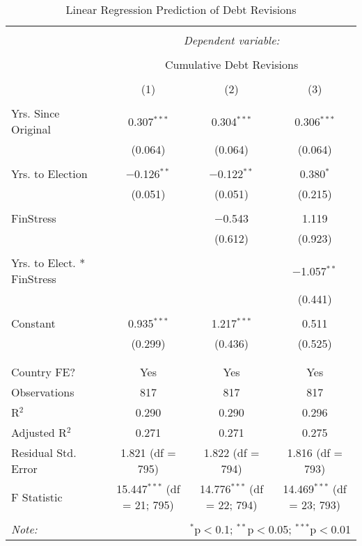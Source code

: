 
\begin{table}[!htbp] \centering 
  \caption{Linear Regression Prediction of Debt Revisions} 
  \label{debt_results} 
\footnotesize 
\begin{tabular}{@{\extracolsep{5pt}}lccc} 
\\[-1.8ex]\hline 
\hline \\[-1.8ex] 
 & \multicolumn{3}{c}{\textit{Dependent variable:}} \\ 
\cline{2-4} 
\\[-1.8ex] & \multicolumn{3}{c}{Cumulative Debt Revisions} \\ 
\\[-1.8ex] & (1) & (2) & (3)\\ 
\hline \\[-1.8ex] 
 Yrs. Since Original & 0.307$^{***}$ & 0.304$^{***}$ & 0.306$^{***}$ \\ 
  & (0.064) & (0.064) & (0.064) \\ 
  & & & \\ 
 Yrs. to Election & $-$0.126$^{**}$ & $-$0.122$^{**}$ & 0.380$^{*}$ \\ 
  & (0.051) & (0.051) & (0.215) \\ 
  & & & \\ 
 FinStress &  & $-$0.543 & 1.119 \\ 
  &  & (0.612) & (0.923) \\ 
  & & & \\ 
 Yrs. to Elect. * FinStress &  &  & $-$1.057$^{**}$ \\ 
  &  &  & (0.441) \\ 
  & & & \\ 
 Constant & 0.935$^{***}$ & 1.217$^{***}$ & 0.511 \\ 
  & (0.299) & (0.436) & (0.525) \\ 
  & & & \\ 
\hline \\[-1.8ex] 
Country FE? & Yes & Yes & Yes \\ 
Observations & 817 & 817 & 817 \\ 
R$^{2}$ & 0.290 & 0.290 & 0.296 \\ 
Adjusted R$^{2}$ & 0.271 & 0.271 & 0.275 \\ 
Residual Std. Error & 1.821 (df = 795) & 1.822 (df = 794) & 1.816 (df = 793) \\ 
F Statistic & 15.447$^{***}$ (df = 21; 795) & 14.776$^{***}$ (df = 22; 794) & 14.469$^{***}$ (df = 23; 793) \\ 
\hline 
\hline \\[-1.8ex] 
\textit{Note:}  & \multicolumn{3}{r}{$^{*}$p$<$0.1; $^{**}$p$<$0.05; $^{***}$p$<$0.01} \\ 
\end{tabular} 
\end{table} 
